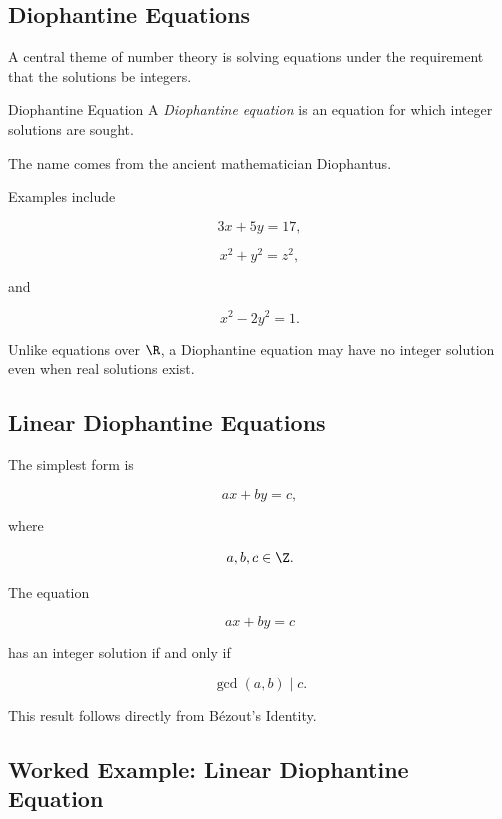 \subsection{Diophantine Equations}
\label{subsec:diophantine-equations-elementary}

A central theme of number theory is solving equations under the requirement
that the solutions be integers.

\begin{definitionbox}{Diophantine Equation}
A \emph{Diophantine equation} is an equation for which integer solutions are
sought.
\end{definitionbox}

The name comes from the ancient mathematician Diophantus.

Examples include

\[ 3x+5y=17, \]

\[ x^2+y^2=z^2, \]

and

\[ x^2-2y^2=1. \]

Unlike equations over \(\R\), a Diophantine equation may have no integer
solution even when real solutions exist.

\subsection{Linear Diophantine Equations}
\label{subsec:linear-diophantine-equations}

The simplest form is

\[ ax+by=c, \]

where

\[ a,b,c\in\Z. \]

\begin{theorem}
The equation

\[ ax+by=c \]

has an integer solution if and only if

\[ \gcd(a,b)\mid c. \]
\end{theorem}

This result follows directly from Bézout's Identity.

\subsection{Worked Example: Linear Diophantine Equation}
\label{subsec:worked-linear-diophantine}

